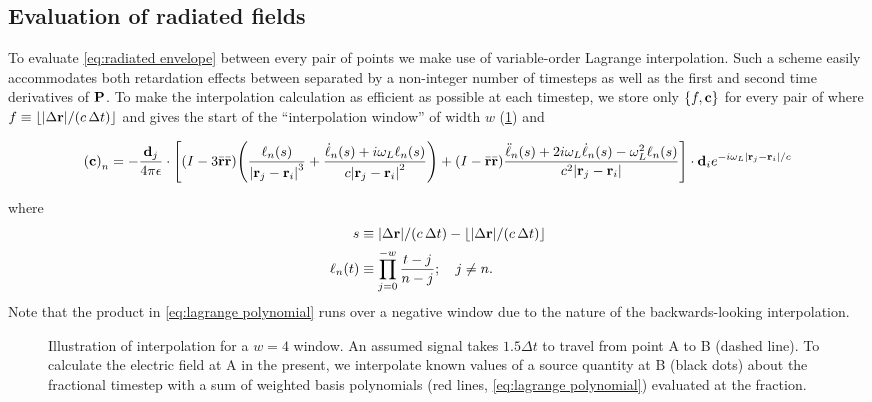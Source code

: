 \subsection{Evaluation of radiated fields}

To evaluate \cref{eq:radiated envelope} between every pair of points we make use of variable-order Lagrange interpolation.
Such a scheme easily accommodates both retardation effects between \qds{} separated by a non-integer number of timesteps as well as the first and second time derivatives of $\vb{P}$.
To make the interpolation calculation as efficient as possible at each timestep, we store only $\qty{f, \vb{c}}$ for every pair of \qds{} where
$f \equiv \lfloor \abs{\Delta \vb{r}}/(c \, \Delta t) \rfloor$ and gives the start of the ``interpolation window'' of width $w$ (\cref{fig:interpolation}) and 
\begin{widetext}
\begin{equation}
  \qty(\vb{c})_n = -\frac{\vb{d}_j}{4\pi \epsilon} \cdot \qty[\qty(I - 3\bar{\vb{r}}\bar{\vb{r}}) \qty(\frac{\ell_n(s)}{\abs{\vb{r}_j - \vb{r}_i}^3} + \frac{\dot{\ell}_n(s) + i \omega_L \ell_n(s)}{c \abs{\vb{r}_j - \vb{r}_i}^2}) +
    \qty(I - \bar{\vb{r}}\bar{\vb{r}}) \frac{\ddot{\ell}_n(s) + 2i \omega_L \dot{\ell}_n(s) - \omega_L^2 \ell_n(s)}{c^2 \abs{\vb{r}_j - \vb{r}_i}}] \cdot \vb{d}_i e^{-i \omega_L \abs{\vb{r}_j - \vb{r}_i}/c}
    \label{eq:interpolation coefs}
\end{equation}
\end{widetext}
where
\begin{align}
  s         &\equiv \abs{\Delta \vb{r}}/\qty(c \, \Delta t) - \lfloor \abs{\Delta \vb{r}}/\qty(c \, \Delta t) \rfloor \label{eq:fractional part} \\
  \ell_n(t) &\equiv \prod_{j = 0}^{-w} \frac{t - j}{n - j}; \quad j \not = n. \label{eq:lagrange polynomial}
\end{align}
Note that the product in \cref{eq:lagrange polynomial} runs over a negative window due to the nature of the backwards-looking interpolation.

\begin{figure}
  
  \caption{\label{fig:interpolation}Illustration of interpolation for a $w = 4$ window.
    An assumed signal takes $1.5\Delta t$ to travel from point A to B (dashed line).
    To calculate the electric field at A in the present, we interpolate known values of a source quantity at B (black dots) about the fractional timestep with a sum of weighted basis polynomials (red lines, \cref{eq:lagrange polynomial}) evaluated at the fraction.
  }
\end{figure}
